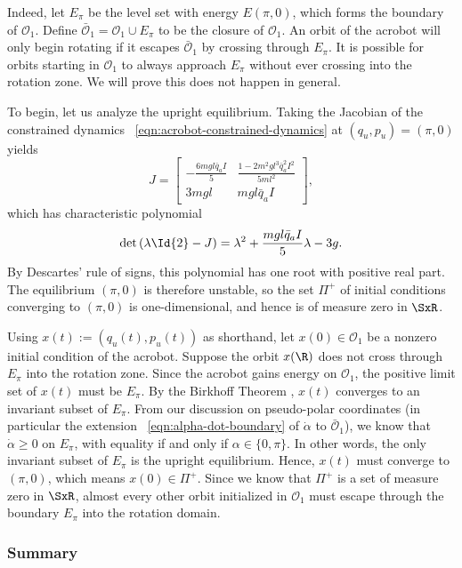 Indeed, let \(E_\pi\) be the level set with energy \(E(\pi,0)\), 
which forms the boundary of \(\mathcal{O}_1\). 
Define \(\bar{\mathcal{O}}_1 = \mathcal{O}_1 \cup E_\pi\) to be the closure of
\(\mathcal{O}_1\).
An orbit of the acrobot will only begin rotating if it escapes 
\(\bar{\mathcal{O}}_1\) by crossing through \(E_\pi\).
It is possible for orbits starting in \(\mathcal{O}_1\) to always approach
\(E_\pi\) without ever crossing into the rotation zone.
We will prove this does not happen in general.

To begin, let us analyze the upright equilibrium.
Taking the Jacobian of the constrained dynamics
~\eqref{eqn:acrobot-constrained-dynamics} at \((q_u,p_u) = (\pi,0)\) yields
\[
    J = \begin{bmatrix}
        -\frac{6mgl\bar{q}_aI}{5} & \frac{1 - 2m^2gl^3\bar{q}_a^2 I^2}{5ml^2} \\
        3mgl & mgl\bar{q}_aI
    \end{bmatrix}
    ,
\]
which has characteristic polynomial
\[
    \det\left(\lambda \Id{2} - J\right)
    = \lambda^2 + \frac{mgl\bar{q}_a I}{5} \lambda - 3g
    .
\]
By Descartes' rule of signs, this polynomial has one root with positive real
part. 
The equilibrium \((\pi,0)\) is therefore unstable, so the set \(\Pi^+\) of
initial conditions converging to \((\pi,0)\) is one-dimensional, and hence is
of measure zero in \(\SxR\).

Using \(x(t) := (q_u(t),p_u(t))\) as shorthand, let
\(x(0) \in \mathcal{O}_1\) be a nonzero initial condition of the acrobot.
Suppose the orbit \(x(\R)\) does not cross through \(E_\pi\)
into the rotation zone.
Since the acrobot gains energy on \(\mathcal{O}_1\), the positive limit set of
\(x(t)\) must be \(E_\pi\). 
By the Birkhoff Theorem \cite{birkhoff}, \(x(t)\) converges to an invariant
subset of \(E_\pi\).
From our discussion on pseudo-polar coordinates (in particular the extension
~\eqref{eqn:alpha-dot-boundary} of \(\dot{\alpha}\) to \(\bar{\mathcal{O}}_1\)),
we know that \(\dot{\alpha} \geq 0\) on \(E_\pi\), with equality if and only if 
\(\alpha \in \{0,\pi\}\).
In other words, the only invariant subset of \(E_\pi\) is the upright equilibrium.
Hence, \(x(t)\) must converge to \((\pi,0)\), which means \(x(0) \in \Pi^+\).
Since we know that \(\Pi^+\) is a set of measure zero in \(\SxR\), almost every
other orbit initialized in \(\mathcal{O}_1\) must escape through the boundary
\(E_\pi\) into the rotation domain.


\subsubsection*{Summary}

